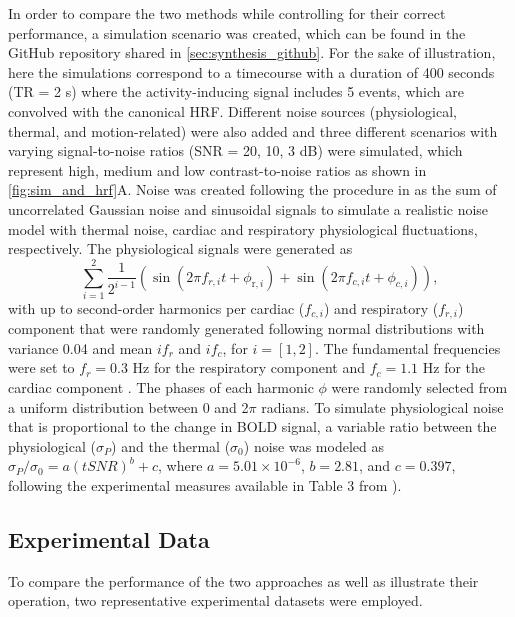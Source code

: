 In order to compare the two methods while controlling for their correct
performance, a simulation scenario was created, which can be found in the GitHub
repository shared in \cref{sec:synthesis_github}. For the sake of illustration,
here the simulations correspond to a timecourse with a duration of 400 seconds
(TR = 2 s) where the activity-inducing signal includes 5 events, which are
convolved with the canonical HRF. Different noise sources (physiological,
thermal, and motion-related) were also added and three different scenarios with
varying signal-to-noise ratios (SNR = 20, 10, 3 dB) were simulated, which
represent high, medium and low contrast-to-noise ratios as shown in
\cref{fig:sim_and_hrf}A. Noise was created following the procedure in
\citep{Gaudes2013Paradigmfreemapping} as the sum of uncorrelated Gaussian noise
and sinusoidal signals to simulate a realistic noise model with thermal noise,
cardiac and respiratory physiological fluctuations, respectively. The
physiological signals were generated as
\begin{equation}
    \sum_{i=1}^{2} \frac{1}{2^{i-1}}\left(\sin \left(2 \pi f_{r, i} t+\phi_{\mathrm{r}, i}\right)+\sin \left(2 \pi f_{c, i} t+\phi_{c, i}\right)\right),
\end{equation}
with up to second-order harmonics per cardiac (\(f_{c,i}\)) and respiratory
(\(f_{r,i}\)) component that were randomly generated following normal
distributions with variance 0.04 and mean \(if_r\) and \(if_c\), for \(i = [1,
2]\). The fundamental frequencies were set to \(f_r = 0.3\) Hz for the
respiratory component \citep{Birn2006Separatingrespiratoryvariation} and \(f_c =
1.1\) Hz for the cardiac component \citep{Shmueli2007Lowfrequencyfluctuations}.
The phases of each harmonic \(\phi\) were randomly selected from a uniform
distribution between 0 and 2$\pi$ radians. To simulate physiological noise that
is proportional to the change in BOLD signal, a variable ratio between the
physiological (\(\sigma_P\)) and the thermal (\(\sigma_0\)) noise was modeled as
\(\sigma_P/\sigma_0 = a(tSNR)^b + c\), where \(a = 5.01 \times 10^{-6}\), \(b =
2.81\), and \(c = 0.397\), following the experimental measures available in
Table 3 from \citep{Triantafyllou2005Comparisonphysiologicalnoise}).

\subsection{Experimental Data}
To compare the performance of the two approaches as well as illustrate their
operation, two representative experimental datasets were employed.

